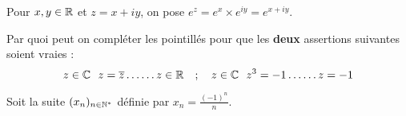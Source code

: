 \begin{question}
Pour $x,y \in \mathbb{R}$ et $z=x+iy$, on pose $e^z=e^x \times
e^{iy}=e^{x+iy}$.
\begin{answers}




\end{answers}
\end{question}


\begin{question}
Par quoi peut on compléter les pointillés pour que les
\textbf{deux} assertions suivantes soient vraies :
$$ z\in \mathbb{C} \ \ z=\overline{z} \ldots\ldots z\in \mathbb{R} \quad ; \quad z\in \mathbb{C} \ \ z^3=-1 \ldots\ldots z=-1$$
\begin{answers}




\end{answers}
\end{question}


\begin{question}
Soit la suite $(x_n)_{n\in\mathbb{N}^*}$ définie par $x_n =
\frac{(-1)^n}{n}$.
\begin{answers}




\end{answers}
\end{question}


